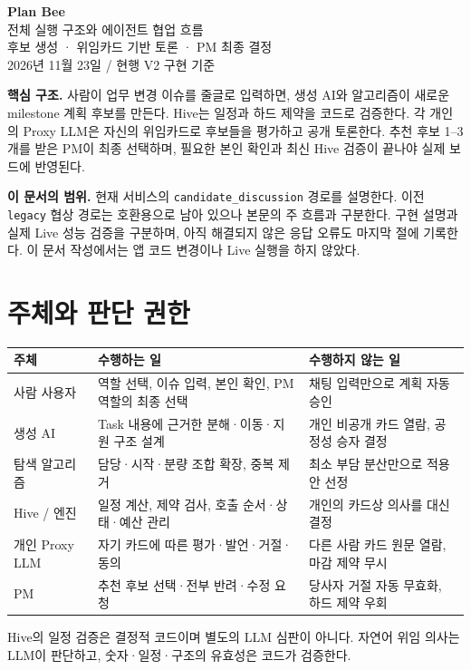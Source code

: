 \documentclass[11pt,a4paper]{article}
\begin{document}
\begin{center}
{\Huge\bfseries Plan Bee}\\[5mm]
{\LARGE 전체 실행 구조와 에이전트 협업 흐름}\\[3mm]
{\large 후보 생성 · 위임카드 기반 토론 · PM 최종 결정}\\[3mm]
2026년 11월 23일 / 현행 V2 구현 기준
\end{center}
\vspace{3mm}
\textbf{핵심 구조.} 사람이 업무 변경 이슈를 줄글로 입력하면, 생성 AI와 알고리즘이 새로운 milestone 계획 후보를 만든다. Hive는 일정과 하드 제약을 코드로 검증한다. 각 개인의 Proxy LLM은 자신의 위임카드로 후보들을 평가하고 공개 토론한다. 추천 후보 1--3개를 받은 PM이 최종 선택하며, 필요한 본인 확인과 최신 Hive 검증이 끝나야 실제 보드에 반영된다.

\textbf{이 문서의 범위.} 현재 서비스의 \texttt{candidate\_discussion} 경로를 설명한다. 이전 \texttt{legacy} 협상 경로는 호환용으로 남아 있으나 본문의 주 흐름과 구분한다. 구현 설명과 실제 Live 성능 검증을 구분하며, 아직 해결되지 않은 응답 오류도 마지막 절에 기록한다. 이 문서 작성에서는 앱 코드 변경이나 Live 실행을 하지 않았다.

\section{주체와 판단 권한}
\begin{tabularx}{\linewidth}{@{}p{27mm}YY@{}}\toprule
주체 & 수행하는 일 & 수행하지 않는 일\\\midrule
사람 사용자 & 역할 선택, 이슈 입력, 본인 확인, PM 역할의 최종 선택 & 채팅 입력만으로 계획 자동 승인\\
생성 AI & Task 내용에 근거한 분해·이동·지원 구조 설계 & 개인 비공개 카드 열람, 공정성 승자 결정\\
탐색 알고리즘 & 담당·시작·분량 조합 확장, 중복 제거 & 최소 부담 분산만으로 적용안 선정\\
Hive / 엔진 & 일정 계산, 제약 검사, 호출 순서·상태·예산 관리 & 개인의 카드상 의사를 대신 결정\\
개인 Proxy LLM & 자기 카드에 따른 평가·발언·거절·동의 & 다른 사람 카드 원문 열람, 마감 제약 무시\\
PM & 추천 후보 선택·전부 반려·수정 요청 & 당사자 거절 자동 무효화, 하드 제약 우회\\\bottomrule
\end{tabularx}

Hive의 일정 검증은 결정적 코드이며 별도의 LLM 심판이 아니다. 자연어 위임 의사는 LLM이 판단하고, 숫자·일정·구조의 유효성은 코드가 검증한다.
\end{document}
